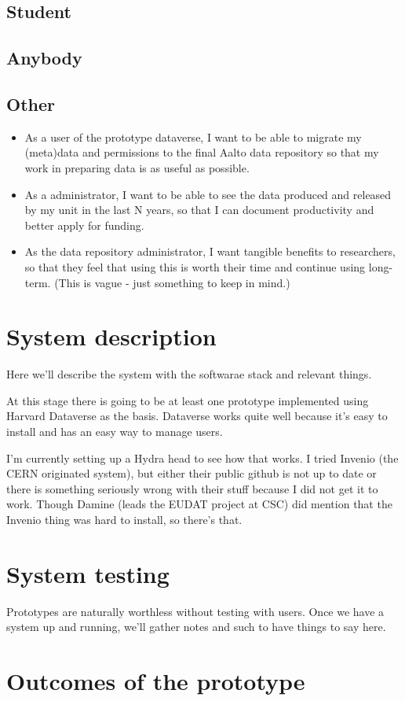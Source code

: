 \subsection{Student}

\subsection{Anybody}

\subsection{Other}

\begin{itemize}
    \item As a user of the prototype dataverse, I want to be able to migrate my
          (meta)data and permissions to the final Aalto data repository so that
          my work in preparing data is as useful as possible.
    \item As a administrator, I want to be able to see the data produced and
          released by my unit in the last N years, so that I can document
          productivity and better apply for funding.
    \item As the data repository administrator, I want tangible benefits to
          researchers, so that they feel that using this is worth their time and
          continue using long-term.  (This is vague - just something to keep in
          mind.)
\end{itemize}

\section{System description}
\label{sec:system_description}

Here we'll describe the system with the softwarae stack and relevant things.

At this stage there is going to be at least one prototype implemented using
Harvard Dataverse as the basis. Dataverse works quite well because it's easy
to install and has an easy way to manage users.

I'm currently setting up a Hydra head to see how that works. I tried Invenio
(the CERN originated system), but either their public github is not up to
date or there is something seriously wrong with their stuff because I did not
get it to work. Though Damine (leads the EUDAT project at CSC) did mention that
the Invenio thing was hard to install, so there's that.

\section{System testing}
\label{sec:system_testing}

Prototypes are naturally worthless without testing with users. Once we have a
system up and running, we'll gather notes and such to have things to say here.

\section{Outcomes of the prototype}
\label{sec:prototype_outcomes}
